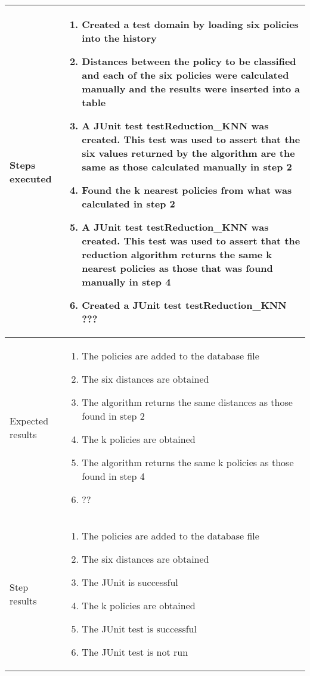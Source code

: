 \documentclass[10pt]{article}
\begin{document}
\begin{center}
\begin{longtable}{ | p{4cm} | p{10cm} | }
			Steps executed & 	\begin{enumerate}
							\item Created a test domain by loading six policies into the history
							\item Distances between the policy to be classified and each of the six policies were calculated manually and the results were inserted into a table
							\item A JUnit test testReduction_KNN was created. This test was used to assert that the six values returned by the algorithm are the same as those calculated manually in step 2
							\item Found the k nearest policies from what was calculated in step 2
							\item A JUnit test testReduction_KNN was created. This test was used to assert that the reduction algorithm returns the same k nearest policies as those that was found manually in step 4
							\item Created a JUnit test testReduction_KNN ???
						\end{enumerate} \\ [3pt] \hline
			
			Expected results &	\begin{enumerate}
							\item The policies are added to the database file
							\item The six distances are obtained
							\item The algorithm returns the same distances as those found in step 2
							\item The k policies are obtained
							\item The algorithm returns the same k policies as those found in step 4
							\item ??
						\end{enumerate}
							 \\  [3pt] \hline

			Step results & 	\begin{enumerate}
							\item The policies are added to the database file
							\item The six distances are obtained
							\item The JUnit is successful
							\item The k policies are obtained
							\item The JUnit test is successful
							\item The JUnit test is not run
						\end{enumerate}
							 \\  [3pt] \hline


\end{longtable}
\end{center}
\end{document}
